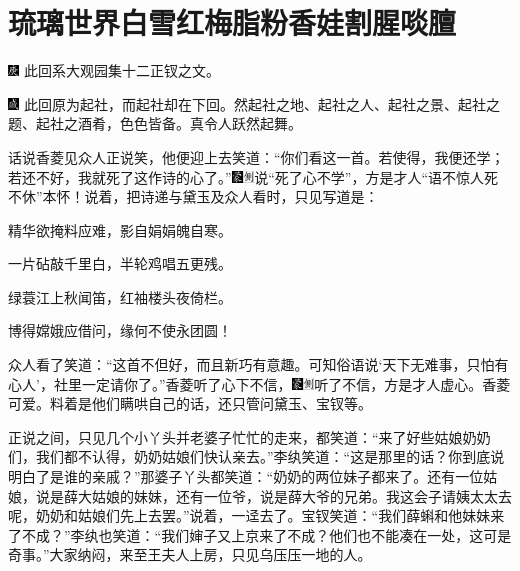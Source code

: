 

\chapter{琉璃世界白雪红梅\hspace{.5em}脂粉香娃割腥啖膻}

{\includegraphics[width=3mm]{../Images/00004}  \kaishu 此回系大观园集十二正钗之文。}

{\includegraphics[width=3mm]{../Images/00005}  \kaishu 此回原为起社，而起社却在下回。然起社之地、起社之人、起社之景、起社之题、起社之酒肴，色色皆备。真令人跃然起舞。}

话说香菱见众人正说笑，他便迎上去笑道：``你们看这一首。若使得，我便还学；若还不好，我就死了这作诗的心了。''{\includegraphics[width=3mm]{../Images/00006}\includegraphics[width=3mm]{../Images/00011}\footnotesize \kaishu 说``死了心不学''，方是才人``语不惊人死不休''本怀！}说着，把诗递与黛玉及众人看时，只见写道是：

精华欲掩料应难，影自娟娟魄自寒。

一片砧敲千里白，半轮鸡唱五更残。

绿蓑江上秋闻笛，红袖楼头夜倚栏。

博得嫦娥应借问，缘何不使永团圆！

众人看了笑道：``这首不但好，而且新巧有意趣。可知俗语说`天下无难事，只怕有心人'，社里一定请你了。''香菱听了心下不信，{\includegraphics[width=3mm]{../Images/00006}\includegraphics[width=3mm]{../Images/00011}\footnotesize \kaishu 听了不信，方是才人虚心。香菱可爱。}料着是他们瞒哄自己的话，还只管问黛玉、宝钗等。

正说之间，只见几个小丫头并老婆子忙忙的走来，都笑道：``来了好些姑娘奶奶们，我们都不认得，奶奶姑娘们快认亲去。''李纨笑道：``这是那里的话？你到底说明白了是谁的亲戚？''那婆子丫头都笑道：``奶奶的两位妹子都来了。还有一位姑娘，说是薛大姑娘的妹妹，还有一位爷，说是薛大爷的兄弟。我这会子请姨太太去呢，奶奶和姑娘们先上去罢。''说着，一迳去了。宝钗笑道：``我们薛蝌和他妹妹来了不成？''李纨也笑道：``我们婶子又上京来了不成？他们也不能凑在一处，这可是奇事。''大家纳闷，来至王夫人上房，只见乌压压一地的人。

